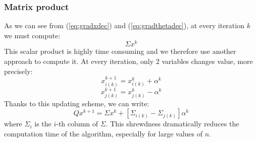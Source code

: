 \subsubsection{Matrix product}
As we can see from (\ref{eq:gradxdec}) and (\ref{eq:gradthetadec}), at every iteration $k$ we must compute:
\begin{equation}
\Sigma  x^{k}
\end{equation}
This scalar product is highly time consuming and we therefore use another approach to compute it. At every iteration, only 2 variables changes value, more precisely:
\begin{equation}
x_{i(k)}^{k+1} = x_{i(k)}^{k} + \alpha^{k}
\end{equation}
\begin{equation}
x_{j(k)}^{k+1} = x_{j(k)}^{k} - \alpha^{k}
\end{equation}
Thanks to this updating scheme, we can write:
\begin{equation}
Q x^{k+1} = \Sigma  x^{k} + \left[\Sigma_{i(k)} - \Sigma_{j(k)}\right]\alpha^{k} 
\end{equation}
where $\Sigma_{i}$ is the $i$-th column of $\Sigma$. This shrewdness dramatically reduces the computation time of the algorithm, especially for large values of $n$.


